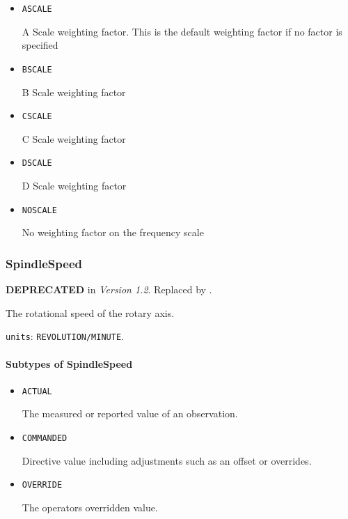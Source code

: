 \begin{itemize}

\item \texttt{A\textunderscore SCALE}


A Scale weighting factor.   This is the default weighting factor if no factor is specified

\item \texttt{B\textunderscore SCALE}


B Scale weighting factor

\item \texttt{C\textunderscore SCALE}


C Scale weighting factor

\item \texttt{D\textunderscore SCALE}


D Scale weighting factor

\item \texttt{NO\textunderscore SCALE}


No weighting factor on the frequency scale


\end{itemize}








\subsubsection{SpindleSpeed}
\label{sec:SpindleSpeed}



\textbf{DEPRECATED} in \textit{Version 1.2}.  Replaced by .

The rotational speed of the rotary axis.


\texttt{units}: \texttt{REVOLUTION/MINUTE}.

\paragraph{Subtypes of SpindleSpeed}\mbox{}
\label{sec:Subtypes of SpindleSpeed}

\begin{itemize}

\item \texttt{ACTUAL}


The measured or reported value of an \gls{observation}.

\item \texttt{COMMANDED}


Directive value including adjustments such as an offset or overrides.

\item \texttt{OVERRIDE}


The operators overridden value.


\end{itemize}






